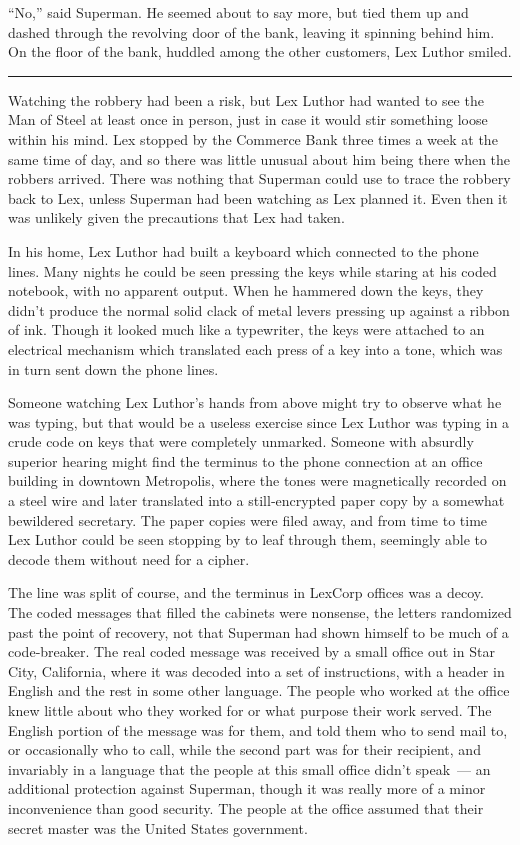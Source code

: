 \documentclass[ebook,12pt]{memoir}
\begin{document}
``No,'' said Superman. He seemed about to say more, but tied them up and
dashed through the revolving door of the bank, leaving it spinning
behind him. On the floor of the bank, huddled among the other customers,
Lex Luthor smiled.

\begin{center}\rule{0.5\linewidth}{0.5pt}\end{center}

Watching the robbery had been a risk, but Lex Luthor had wanted to see
the Man of Steel at least once in person, just in case it would stir
something loose within his mind. Lex stopped by the Commerce Bank three
times a week at the same time of day, and so there was little unusual
about him being there when the robbers arrived. There was nothing that
Superman could use to trace the robbery back to Lex, unless Superman had
been watching as Lex planned it. Even then it was unlikely given the
precautions that Lex had taken.

In his home, Lex Luthor had built a keyboard which connected to the
phone lines. Many nights he could be seen pressing the keys while
staring at his coded notebook, with no apparent output. When he hammered
down the keys, they didn't produce the normal solid clack of metal
levers pressing up against a ribbon of ink. Though it looked much like a
typewriter, the keys were attached to an electrical mechanism which
translated each press of a key into a tone, which was in turn sent down
the phone lines.

Someone watching Lex Luthor's hands from above might try to observe what
he was typing, but that would be a useless exercise since Lex Luthor was
typing in a crude code on keys that were completely unmarked. Someone
with absurdly superior hearing might find the terminus to the phone
connection at an office building in downtown Metropolis, where the tones
were magnetically recorded on a steel wire and later translated into a
still‐encrypted paper copy by a somewhat bewildered secretary. The paper
copies were filed away, and from time to time Lex Luthor could be seen
stopping by to leaf through them, seemingly able to decode them without
need for a cipher.

The line was split of course, and the terminus in LexCorp offices was a
decoy. The coded messages that filled the cabinets were nonsense, the
letters randomized past the point of recovery, not that Superman had
shown himself to be much of a code‐breaker. The real coded message was
received by a small office out in Star City, California, where it was
decoded into a set of instructions, with a header in English and the
rest in some other language. The people who worked at the office knew
little about who they worked for or what purpose their work served. The
English portion of the message was for them, and told them who to send
mail to, or occasionally who to call, while the second part was for
their recipient, and invariably in a language that the people at this
small office didn't speak~--- an additional protection against Superman,
though it was really more of a minor inconvenience than good security.
The people at the office assumed that their secret master was the United
States government.
\end{document}

